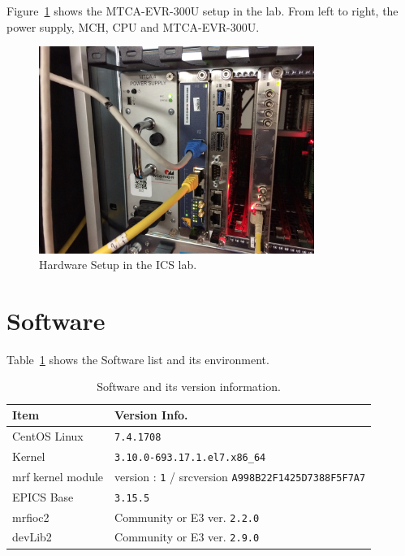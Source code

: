 \documentclass[11pt
  , a4paper
  , article
  , oneside
  , showtrims
]{memoir}
\begin{document}
Figure~\ref{fig:mtca-system} shows the MTCA-EVR-300U setup in the lab. From left to right, the power supply, MCH, CPU and MTCA-EVR-300U.
\begin{figure}[!b]
  \centering
  \includegraphics[width=0.8\textwidth]{./pictures/mtca_system.jpg}
  \caption{Hardware Setup in the ICS lab.}
  \label{fig:mtca-system}
\end{figure}


\clearpage
\section{Software}
Table~\ref{table:swlist} shows the Software list and its environment.
\begin{table}[!htb]
  \centering
  \begin{tabular}{l|l}
    \toprule
    Item               & Version Info.                                                       \\\midrule
    CentOS Linux       & \texttt{7.4.1708}                                                   \\\midrule
    Kernel             & \texttt{3.10.0-693.17.1.el7.x86\_64}                                 \\\midrule
    mrf kernel module  & version : \texttt{1} / srcversion \texttt{A998B22F1425D7388F5F7A7}  \\\midrule
    EPICS Base         & \texttt{3.15.5}                                                     \\\midrule
    mrfioc2            & Community or E3 ver. \texttt{2.2.0}                                     \\\midrule
    devLib2            & Community or E3 ver. \texttt{2.9.0}                                      \\\bottomrule
  \end{tabular}
  \caption[]{Software and its version information.}
  \label{table:swlist}
\end{table}
\end{document}
